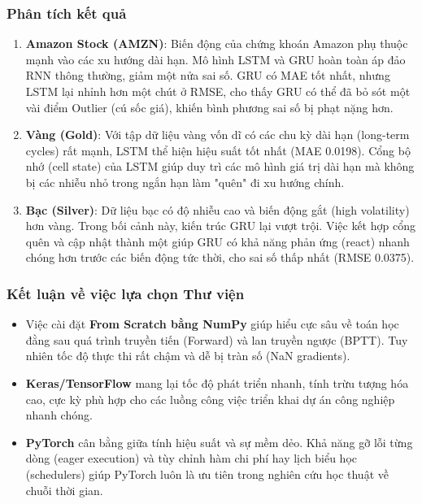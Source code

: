 \documentclass[12pt,a4paper]{article}
\begin{document}
\subsubsection{Phân tích kết quả}
\begin{enumerate}
    \item \textbf{Amazon Stock (AMZN)}: 
    Biến động của chứng khoán Amazon phụ thuộc mạnh vào các xu hướng dài hạn. Mô hình LSTM và GRU hoàn toàn áp đảo RNN thông thường, giảm một nửa sai số. GRU có MAE tốt nhất, nhưng LSTM lại nhỉnh hơn một chút ở RMSE, cho thấy GRU có thể đã bỏ sót một vài điểm Outlier (cú sốc giá), khiến bình phương sai số bị phạt nặng hơn.
    
    \item \textbf{Vàng (Gold)}:
    Với tập dữ liệu vàng vốn dĩ có các chu kỳ dài hạn (long-term cycles) rất mạnh, LSTM thể hiện hiệu suất tốt nhất (MAE 0.0198). Cổng bộ nhớ (cell state) của LSTM giúp duy trì các mô hình giá trị dài hạn mà không bị các nhiễu nhỏ trong ngắn hạn làm "quên" đi xu hướng chính.
    
    \item \textbf{Bạc (Silver)}:
    Dữ liệu bạc có độ nhiễu cao và biến động gắt (high volatility) hơn vàng. Trong bối cảnh này, kiến trúc GRU lại vượt trội. Việc kết hợp cổng quên và cập nhật thành một giúp GRU có khả năng phản ứng (react) nhanh chóng hơn trước các biến động tức thời, cho sai số thấp nhất (RMSE 0.0375).
\end{enumerate}

\subsubsection{Kết luận về việc lựa chọn Thư viện}
\begin{itemize}
    \item Việc cài đặt \textbf{From Scratch bằng NumPy} giúp hiểu cực sâu về toán học đằng sau quá trình truyền tiến (Forward) và lan truyền ngược (BPTT). Tuy nhiên tốc độ thực thi rất chậm và dễ bị tràn số (NaN gradients).
    \item \textbf{Keras/TensorFlow} mang lại tốc độ phát triển nhanh, tính trừu tượng hóa cao, cực kỳ phù hợp cho các luồng công việc triển khai dự án công nghiệp nhanh chóng.
    \item \textbf{PyTorch} cân bằng giữa tính hiệu suất và sự mềm dẻo. Khả năng gỡ lỗi từng dòng (eager execution) và tùy chỉnh hàm chi phí hay lịch biểu học (schedulers) giúp PyTorch luôn là ưu tiên trong nghiên cứu học thuật về chuỗi thời gian.
\end{itemize}
\end{document}
